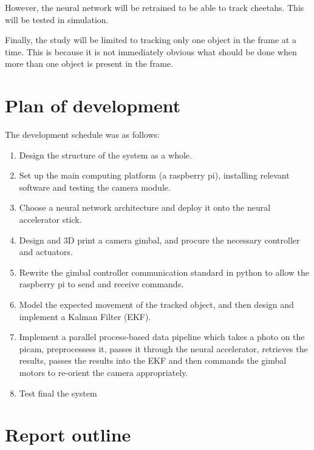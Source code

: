 However, the neural network will be retrained to be able to track cheetahs. This will be tested in simulation.

Finally, the study will be limited to tracking only one object in the frame at a time. This is because it is not immediately obvious what should be done when more than one object is present in the frame.


\section{Plan of development}
The development schedule was as follows:

\begin{enumerate}
\item Design the structure of the system as a whole.
\item Set up the main computing platform (a raspberry pi), installing relevant software and testing the camera module.
\item Choose a neural network architecture and deploy it onto the neural accelerator stick.
\item Design and 3D print a camera gimbal, and procure the necessary controller and actuators.
\item Rewrite the gimbal controller communication standard in python to allow the raspberry pi to send and receive commands.
\item Model the expected movement of the tracked object, and then design and implement a Kalman Filter (EKF).
\item Implement a parallel process-based data pipeline which takes a photo on the picam, preprocessess it, passes it through the neural accelerator, retrieves the results, passes the results into the EKF and then commands the gimbal motors to re-orient the camera appropriately.
\item Test final the system
\end{enumerate}

\section{Report outline}


